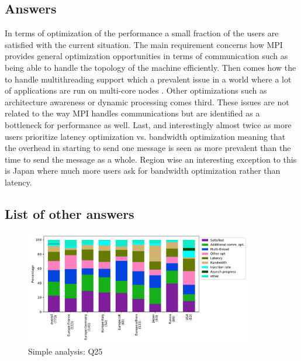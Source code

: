 
\subsection{Answers}


In terms of optimization of the performance a small fraction of the users
are satisfied with the current situation. The main requirement concerns how MPI
provides general optimization opportunities in terms of communication such as
being able to handle the topology of the machine efficiently. Then comes how the
to handle multithreading support which a prevalent issue in a world where a
lot of applications are run on multi-core nodes . Other optimizations such as architecture awareness or dynamic
processing comes third. These issues are not related to the way MPI handles
communications but are identified as a bottleneck for performance as well. Last,
and interestingly almost twice as more users prioritize latency
optimization vs. bandwidth optimization meaning that the overhead in starting to
send one message is seen as more prevalent than the time to send the message as
a whole. Region wise an interesting exception to this is Japan where much more
users ask for bandwidth optimization rather than
latency. 

\subsection{List of other answers}
\begin{itemize}

\end{itemize}

\begin{figure}[htb]
\begin{center}
\includegraphics[width=10cm]{../pdfs/Q25.pdf}
\caption{Simple analysis: Q25}
\label{fig:Q25}
\end{center}
\end{figure}

